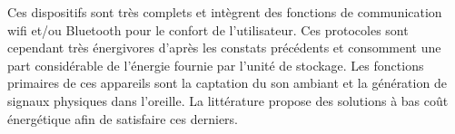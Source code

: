\begin{table}[!htbp]
\begin{minipage}[c]{0.5\textwidth}
\begin{figure}[H]
		\end{figure}
	\end{minipage}
	\hfillx
	\begin{minipage}[c]{0.4\textwidth}
		\caption{Consommation énergétique des appareils commerciaux}
		\label{tab:appareils_commerciaux_conso}
	\end{minipage}
\end{table}

Ces dispositifs sont très complets et intègrent des fonctions de communication wifi et/ou Bluetooth pour le confort de l'utilisateur. Ces protocoles sont cependant très énergivores d'après les constats précédents et consomment une part considérable de l'énergie fournie par l'unité de stockage. Les fonctions primaires de ces appareils sont la captation du son ambiant et la génération de signaux physiques dans l'oreille. La littérature propose des solutions à bas coût énergétique afin de satisfaire ces derniers. 

